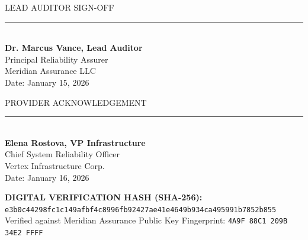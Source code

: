 \documentclass[11pt,a4paper]{scrartcl}
\begin{document}
\noindent
\begin{minipage}[t]{0.45\textwidth}
    \textcolor{textmuted}{\tiny LEAD AUDITOR SIGN-OFF} \\[4pt]
    \rule{0.9\textwidth}{0.4pt} \\[6pt]
    \textbf{\small Dr. Marcus Vance, Lead Auditor} \\
    \textcolor{textmuted}{\small Principal Reliability Assurer} \\
    \textcolor{textmuted}{\small Meridian Assurance LLC} \\[2pt]
    {\tiny Date: January 15, 2026}
\end{minipage}%
\hfill
\begin{minipage}[t]{0.45\textwidth}
    \textcolor{textmuted}{\tiny PROVIDER ACKNOWLEDGEMENT} \\[4pt]
    \rule{0.9\textwidth}{0.4pt} \\[6pt]
    \textbf{\small Elena Rostova, VP Infrastructure} \\
    \textcolor{textmuted}{\small Chief System Reliability Officer} \\
    \textcolor{textmuted}{\small Vertex Infrastructure Corp.} \\[2pt]
    {\tiny Date: January 16, 2026}
\end{minipage}

\vspace{14pt}

\begin{tcolorbox}[
    enhanced,
    colback=lightbg,
    colframe=cardborder,
    arc=2pt,
    boxrule=0.5pt,
    left=8pt, right=8pt, top=4pt, bottom=4pt
]
    \tiny \textcolor{textmuted}{\textbf{DIGITAL VERIFICATION HASH (SHA-256):} \texttt{e3b0c44298fc1c149afbf4c8996fb92427ae41e4649b934ca495991b7852b855}} \\
    \tiny \textcolor{textmuted}{Verified against Meridian Assurance Public Key Fingerprint: \texttt{4A9F 88C1 209B 34E2 FFFF}}
\end{tcolorbox}
\end{document}
